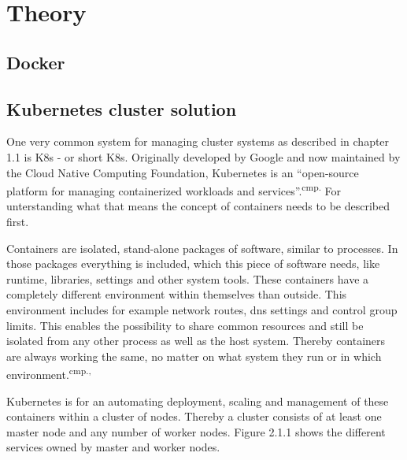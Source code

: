 \chapter{Theory}

\section{Docker} 

\section{Kubernetes cluster solution}

One very common system for managing cluster systems as described in chapter 1.1 is \acl{K8s} - or short \acs{K8s}. Originally developed by Google and now maintained by the Cloud Native Computing Foundation, Kubernetes is an ``open-source platform for managing containerized workloads and services''.\textsuperscript{cmp.\cite{12}} For unterstanding what that means the concept of containers needs to be described first.


Containers are isolated, stand-alone packages of software, similar to processes. In those packages everything is included, which this piece of software needs, like runtime, libraries, settings and other system tools.  These containers have a completely different environment within themselves than outside. This environment includes for example network routes, dns settings and control group limits. This enables the possibility to share common resources and still be isolated from any other process as well as the host system. Thereby containers are always working the same, no matter on what system they run or in which environment.\textsuperscript{cmp.\cite{13}, \cite{14}}


Kubernetes is for an automating deployment, scaling and management of these containers within a cluster of nodes. Thereby a cluster consists of at least one master node and any number of worker nodes. Figure 2.1.1 shows the different services owned by master and worker nodes.

